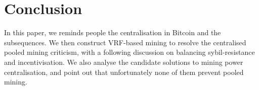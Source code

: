 \section{Conclusion}

In this paper, we reminds people the centralisation in Bitcoin and the subsequences.
We then construct VRF-based mining to resolve the centralised pooled mining criticism,
with a following discussion on balancing sybil-resistance and incentivisation.
We also analyse the candidate solutions to mining power centralisation, and point out that unfortunately none of them prevent pooled mining.